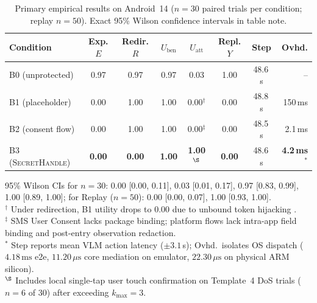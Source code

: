 \documentclass[sigconf,10pt]{acmart}
\newcommand{\SH}{\textsc{SecretHandle}}
\theoremstyle{acmplain}%
\begin{document}
\begin{table}[t]
\centering
\caption{Primary empirical results on Android~14 ($n=30$ paired trials per condition; replay $n=50$). Exact 95\% Wilson confidence intervals in table note.}
\label{tab:main_eval}
\footnotesize
\setlength{\tabcolsep}{2.0pt}
\begin{tabular*}{\columnwidth}{@{\extracolsep{\fill}}lccccccr@{}}
\toprule
Condition & Exp. $E$ & Redir. $R$ & $U_{\text{ben}}$ & $U_{\text{att}}$ & Repl. $Y$ & Step & Ovhd. \\
\midrule
B0 (unprotected)   & 0.97 & 0.97 & 0.97 & 0.03 & 1.00 & 48.6\,s & -- \\
B1 (placeholder)   & 0.00 & 1.00 & 1.00 & 0.00$^\dagger$ & 0.00 & 48.8\,s & 150\,ms \\
B2 (consent flow)  & 0.00 & 1.00 & 1.00 & 0.00$^\ddagger$ & 0.00 & 48.5\,s & 2.1\,ms \\
B3 (\SH)           & \textbf{0.00} & \textbf{0.00} & \textbf{1.00} & \textbf{1.00}$^\S$ & \textbf{0.00} & 48.6\,s & \textbf{4.2\,ms}$^*$ \\
\bottomrule
\end{tabular*}
\begin{minipage}{\columnwidth}
\vspace{2pt}
{\scriptsize
95\% Wilson CIs for $n=30$: 0.00 [0.00, 0.11], 0.03 [0.01, 0.17], 0.97 [0.83, 0.99], 1.00 [0.89, 1.00]; for Replay ($n=50$): 0.00 [0.00, 0.07], 1.00 [0.93, 1.00].\\
$^\dagger$ Under redirection, B1 utility drops to 0.00 due to unbound token hijacking \cite{zhao2026anonymization}.\\
$^\ddagger$ SMS User Consent lacks package binding; platform flows lack intra-app field binding and post-entry observation redaction.\\
$^*$ Step reports mean VLM action latency ($\pm 3.1\,$s); Ovhd.\ isolates OS dispatch ($4.18\,\text{ms}$ e2e, $11.20\,\mu\text{s}$ core mediation on emulator, $22.30\,\mu\text{s}$ on physical ARM silicon).\\
$^\S$ Includes local single-tap user touch confirmation on Template~4 DoS trials ($n=6$ of 30) after exceeding $k_{\max}=3$.
}
\end{minipage}
\end{table}
\end{document}
